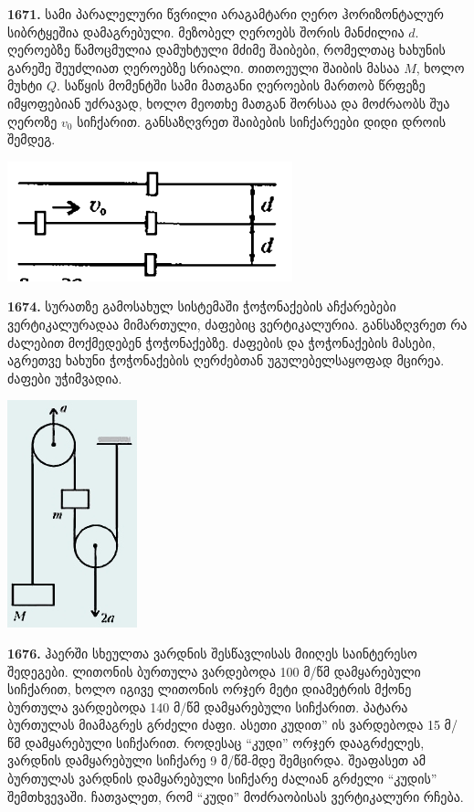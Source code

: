 \documentclass[12pt,a4paper,]{report}
\begin{document}
\textbf{1671.} სამი პარალელური წვრილი არაგამტარი ღერო ჰორიზონტალურ სიბრტყეშია დამაგრებული. მეზობელ ღეროებს შორის მანძილია $d$. ღეროებზე წამოცმულია დამუხტული მძიმე შაიბები, რომელთაც ხახუნის გარეშე შეუძლიათ ღეროებზე სრიალი. თითოეული შაიბის მასაა $M$, ხოლო მუხტი $Q$. საწყის მომენტში სამი მათგანი ღეროების მართობ წრფეზე იმყოფებიან უძრავად, ხოლო მეოთხე მათგან შორსაა და მოძრაობს შუა ღეროზე $v_0$ სიჩქარით. განსაზღვრეთ შაიბების სიჩქარეები დიდი დროის შემდეგ. 
		\begin{center}
			\includegraphics[scale=0.5]{images/F1671}
		\end{center}

\textbf{1674.} სურათზე გამოსახულ სისტემაში ჭოჭონაქების აჩქარებები ვერტიკალურადაა მიმართული, ძაფებიც ვერტიკალურია. განსაზღვრეთ რა ძალებით მოქმედებენ ჭოჭონაქებზე. ძაფების და ჭოჭონაქების მასები, აგრეთვე ხახუნი ჭოჭონაქების ღერძებთან უგულებელსაყოფად მცირეა. ძაფები უჭიმვადია.
		\begin{center}
			\includegraphics[scale=0.5]{images/F1674}
		\end{center}

\textbf{1676.} ჰაერში სხეულთა ვარდნის შესწავლისას მიიღეს საინტერესო შედეგები. ლითონის ბურთულა ვარდებოდა 100 მ/წმ დამყარებული სიჩქარით, ხოლო იგივე ლითონის  ორჯერ მეტი დიამეტრის მქონე ბურთულა ვარდებოდა 140 მ/წმ დამყარებული სიჩქარით. პატარა ბურთულას მიამაგრეს გრძელი ძაფი. ასეთი კუდით” ის ვარდებოდა 15 მ/წმ დამყარებული სიჩქარით. როდესაც “კუდი” ორჯერ დააგრძელეს, ვარდნის დამყარებული სიჩქარე 9 მ/წმ-მდე შემცირდა.  შეაფასეთ ამ ბურთულას ვარდნის  დამყარებული სიჩქარე ძალიან გრძელი “კუდის” შემთხვევაში. ჩათვალეთ, რომ “კუდი” მოძრაობისას ვერტიკალური რჩება. 
\end{document}
